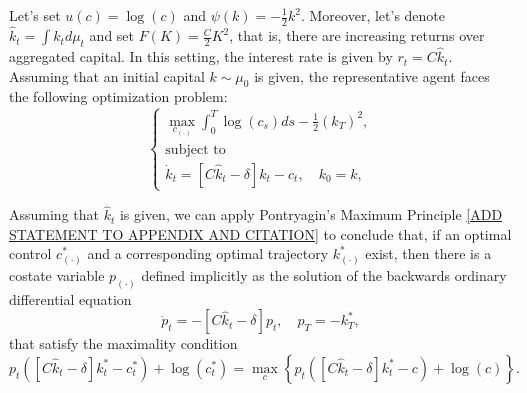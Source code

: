 Let's set $u(c) = \log(c)$ and $\psi(k) = - \frac{1}{2} k^2$.
Moreover, let's denote $\hat k_t = \int k_t d \mu_t$ and set $F(K) = \frac{C}{2} K^2$, that is, there are increasing returns over aggregated capital.
In this setting, the interest rate is given by $r_t = C {\hat k_t} $.
Assuming that an initial capital $k \sim \mu_0$ is given,
the representative agent faces the following optimization problem:
\begin{equation}\label{economic_example:representative_agent}
    \begin{cases}
        \max_{c_{(\cdot)}} \int_0^T \log(c_s) ds -\frac{1}{2}(k_T)^2,\\
        \text{subject to}\\
        \dot k_t = \left[ C {\hat k_t} - \delta \right] k_t - c_t, \quad k_0 = k,
    \end{cases}
\end{equation}


Assuming that ${\hat k_t}$ is given, we can apply Pontryagin's Maximum Principle \ref{ADD STATEMENT TO APPENDIX AND CITATION}
to conclude that, if an optimal control $c^*_{(\cdot)}$ and a corresponding optimal trajectory $k^*_{(\cdot)}$ exist,
then there is a costate variable $p_{(\cdot)}$ defined implicitly as the solution of the backwards ordinary differential equation
\begin{equation}\label{economic_example:costate_ode}
    \dot p_t = -  \left[C{\hat k_t} - \delta \right] p_t, \quad p_T =  - k^*_T,
\end{equation}
that satisfy the maximality condition
\begin{equation}\label{economic_example:maximality_condition}
    p_t\left( \left[C {\hat k_t} - \delta \right]k^*_t - c^*_t \right) + \log(c^*_t) = 
    \max_c \left\{ p_t\left( \left[C {\hat k_t} - \delta \right]k^*_t - c \right) + \log(c) \right\}.
\end{equation}

